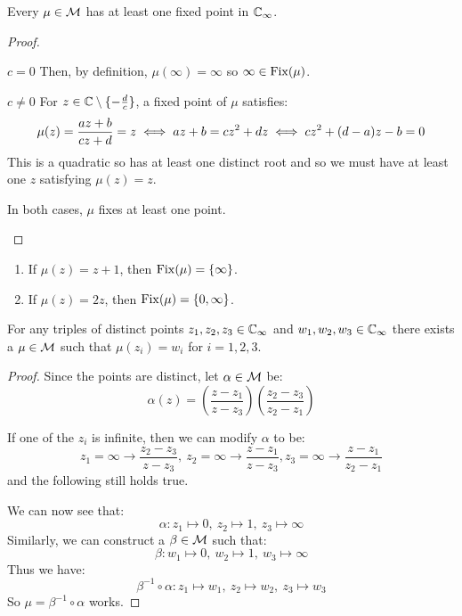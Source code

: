 \documentclass[../main.tex]{subfiles}
\begin{document}
\begin{proposition}
  Every $\mu \in \mathcal{M}$ has at least one fixed point in $\mathbb{C}_{\infty}$.
\end{proposition}
\begin{proof}
  \begin{proofcases}
    \begin{case}{$c = 0$}
      Then, by definition, $\mu(\infty) = \infty$ so $\infty \in \operatorname{Fix}(\mu)$.
    \end{case}
    \begin{case}{$c \neq 0$}
      For $z \in \mathbb{C} \setminus \{-\frac{d}{c}\}$, a fixed point of $\mu$ satisfies:
      \[
        \mu(z) = \frac{az + b}{cz + d} = z \\
        \iff az + b = cz^2 + dz \\
        \iff cz^2 + (d - a)z - b = 0
      \]
      This is a quadratic so has at least one distinct root and so we must have at least one $z$ satisfying $\mu(z) = z$.
    \end{case}
    In both cases, $\mu$ fixes at least one point.
  \end{proofcases}
\end{proof}
\begin{example}
  \begin{enumerate}
    \item If $\mu(z) = z + 1$, then $\operatorname{Fix}(\mu) = \{\infty\}$.
    \item If $\mu(z) = 2z$, then $\operatorname{Fix}(\mu) = \{0, \infty\}$.
  \end{enumerate}
\end{example}
\begin{lemma}
  For any triples of distinct points $z_1, z_2, z_3 \in \mathbb{C}_{\infty}$ and $w_1, w_2, w_3 \in \mathbb{C}_{\infty}$ there exists a $\mu \in \mathcal{M}$ such that $\mu(z_i) = w_i$ for $i = 1, 2, 3$. \label{tripleTransitivity}
\end{lemma}
\begin{proof}
  Since the points are distinct, let $\alpha \in \mathcal{M}$ be:
  \[
    \alpha(z) = \left(\frac{z - z_1}{z - z_3}\right) \left(\frac{z_2 - z_3}{z_2 - z_1}\right)
  \]
  \begin{remark}[Note]
    If one of the $z_i$ is infinite, then we can modify $\alpha$ to be:
    \[
      z_1 = \infty \to \frac{z_2 - z_3}{z - z_3},\ z_2 = \infty \to \frac{z - z_1}{z - z_3}, z_3 = \infty \to \frac{z - z_1}{z_2 - z_1}
    \]
    and the following still holds true.
  \end{remark}
  We can now see that:
  \[
    \alpha: z_1 \mapsto 0,\ z_2 \mapsto 1,\ z_3 \mapsto \infty
  \]
  Similarly, we can construct a $\beta \in \mathcal{M}$ such that:
  \[
    \beta: w_1 \mapsto 0,\ w_2 \mapsto 1,\ w_3 \mapsto \infty
  \]
  Thus we have:
  \[
    \beta^{-1} \circ \alpha: z_1 \mapsto w_1,\ z_2 \mapsto w_2,\ z_3 \mapsto w_3
  \]
  So $\mu = \beta^{-1} \circ \alpha$ works.
\end{proof}
\end{document}
